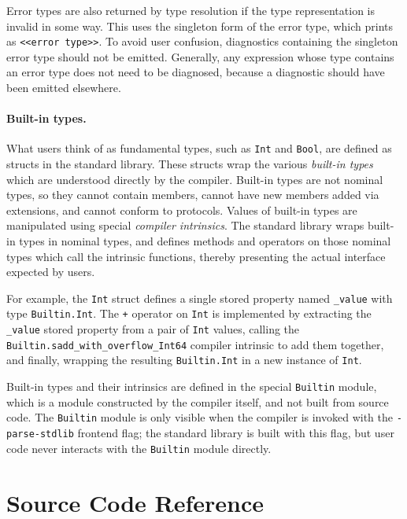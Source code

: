 \documentclass[../generics]{subfiles}
\begin{document}
Error types are also returned by type resolution if the type representation is invalid in some way. This uses the singleton form of the error type, which prints as \texttt{<<error~type>>}. To avoid user confusion, diagnostics containing the singleton error type should not be emitted. Generally, any expression whose type contains an error type does not need to be diagnosed, because a diagnostic should have been emitted elsewhere.

\paragraph{Built-in types.}
What users think of as fundamental types, such as \texttt{Int} and \texttt{Bool}, are defined as structs in the standard library. These structs wrap the various \emph{built-in types} which are understood directly by the compiler. Built-in types are not nominal types, so they cannot contain members, cannot have new members added via extensions, and cannot conform to protocols. Values of built-in types are manipulated using special \emph{compiler intrinsics}. The standard library wraps built-in types in nominal types, and defines methods and operators on those nominal types which call the intrinsic functions, thereby presenting the actual interface expected by users.

For example, the \texttt{Int} struct defines a single stored property named \verb|_value| with type \texttt{Builtin.Int}. The \texttt{+} operator on \texttt{Int} is implemented by extracting the \verb|_value| stored property from a pair of \texttt{Int} values, calling the \verb|Builtin.sadd_with_overflow_Int64| compiler intrinsic to add them together, and finally, wrapping the resulting \texttt{Builtin.Int} in a new instance of \texttt{Int}.

Built-in types and their intrinsics are defined in the special \texttt{Builtin} module, which is a module constructed by the compiler itself, and not built from source code. The \texttt{Builtin} module is only visible when the compiler is invoked with the \texttt{-parse-stdlib} frontend flag; the standard library is built with this flag, but user code never interacts with the \texttt{Builtin} module directly.

\section{Source Code Reference}\label{typesourceref}
\end{document}
